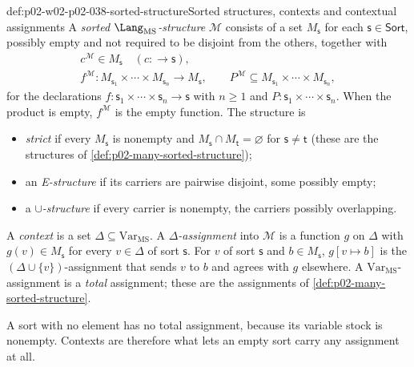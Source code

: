 \begin{hbdefinition}{def:p02-w02-p02-038-sorted-structure}{Sorted structures, contexts and contextual assignments}
A \emph{sorted \(\Lang_{\mathrm{MS}}\)-structure} \(\mathcal M\) consists of
a set \(M_{\mathsf s}\) for each \(\mathsf s\in\mathsf{Sort}\), possibly
empty and not required to be disjoint from the others, together with
\[
\begin{gathered}
 c^{\mathcal M}\in M_{\mathsf s}\quad(c:\longrightarrow\mathsf s),\\
 f^{\mathcal M}:M_{\mathsf s_1}\times\cdots\times M_{\mathsf s_n}
   \longrightarrow M_{\mathsf s},\qquad
 P^{\mathcal M}\subseteq M_{\mathsf s_1}\times\cdots\times M_{\mathsf s_n},
\end{gathered}
\]
for the declarations
\(f:\mathsf s_1\times\cdots\times\mathsf s_n\longrightarrow\mathsf s\) with
\(n\geq1\) and \(P:\mathsf s_1\times\cdots\times\mathsf s_n\).  When the
product is empty, \(f^{\mathcal M}\) is the empty function.  The structure is
\begin{itemize}
\item \emph{strict} if every \(M_{\mathsf s}\) is nonempty and
      \(M_{\mathsf s}\cap M_{\mathsf t}=\varnothing\) for
      \(\mathsf s\ne\mathsf t\) (these are the structures of
      \cref{def:p02-many-sorted-structure});
\item an \emph{E-structure} if its carriers are pairwise disjoint, some
      possibly empty;
\item a \emph{\(\cup\)-structure} if every carrier is nonempty, the carriers
      possibly overlapping.
\end{itemize}
A \emph{context} is a set \(\Delta\subseteq\mathrm{Var}_{\mathrm{MS}}\).  A
\emph{\(\Delta\)-assignment} into \(\mathcal M\) is a function \(g\) on
\(\Delta\) with \(g(v)\in M_{\mathsf s}\) for every \(v\in\Delta\) of sort
\(\mathsf s\).  For \(v\) of sort \(\mathsf s\) and \(b\in M_{\mathsf s}\),
\(g[v\mapsto b]\) is the \((\Delta\cup\{v\})\)-assignment that sends \(v\) to
\(b\) and agrees with \(g\) elsewhere.  A
\(\mathrm{Var}_{\mathrm{MS}}\)-assignment is a \emph{total} assignment; these
are the assignments of \cref{def:p02-many-sorted-structure}.
\end{hbdefinition}

A sort with no element has no total assignment, because its variable stock is
nonempty.  Contexts are therefore what lets an empty sort carry any
assignment at all.

